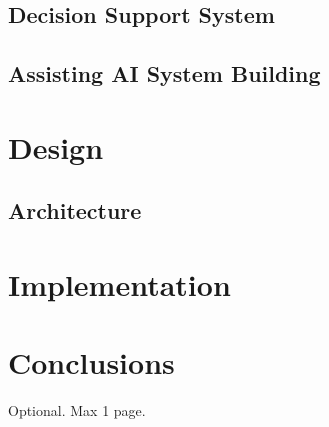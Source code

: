 \documentclass[12pt,a4paper,openright,twoside]{book}
\begin{document}
\section{Decision Support System}

\section{Assisting \ac{AI} System Building}



\chapter{Design}\label{chap:design}

\section{Architecture}






\chapter{Implementation}\label{chap:implementation}





\chapter{Conclusions}
\label{chap:conclusions}




\backmatter

\nocite{*} %




\begin{acknowledgements} %
Optional. Max 1 page.
\end{acknowledgements}
\end{document}
